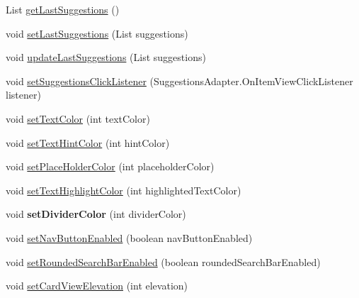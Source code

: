\begin{DoxyCompactItemize}
\item 
List \mbox{\hyperlink{classcom_1_1example_1_1searchwidget_1_1_search_bar_a29fff6f8fe5011b1854e4fd4a55ea65f}{get\+Last\+Suggestions}} ()
\item 
void \mbox{\hyperlink{classcom_1_1example_1_1searchwidget_1_1_search_bar_a36b0bcb2dd221d8cba1b64955a51b597}{set\+Last\+Suggestions}} (List suggestions)
\item 
void \mbox{\hyperlink{classcom_1_1example_1_1searchwidget_1_1_search_bar_af6c85628bb5df58074e37d47193bc3f0}{update\+Last\+Suggestions}} (List suggestions)
\item 
void \mbox{\hyperlink{classcom_1_1example_1_1searchwidget_1_1_search_bar_a2c7e29edef133c2885ed261f14dcd329}{set\+Suggestions\+Click\+Listener}} (Suggestions\+Adapter.\+On\+Item\+View\+Click\+Listener listener)
\item 
void \mbox{\hyperlink{classcom_1_1example_1_1searchwidget_1_1_search_bar_ac6711d0557a28b29ac41b0ed4e489e02}{set\+Text\+Color}} (int text\+Color)
\item 
void \mbox{\hyperlink{classcom_1_1example_1_1searchwidget_1_1_search_bar_a70b21b5c03c532cb74f64e16c992f95d}{set\+Text\+Hint\+Color}} (int hint\+Color)
\item 
void \mbox{\hyperlink{classcom_1_1example_1_1searchwidget_1_1_search_bar_aa27cf7d4a9e11d4b452a7be85c15e9e6}{set\+Place\+Holder\+Color}} (int placeholder\+Color)
\item 
void \mbox{\hyperlink{classcom_1_1example_1_1searchwidget_1_1_search_bar_a538551052205575951500130dc5ed591}{set\+Text\+Highlight\+Color}} (int highlighted\+Text\+Color)
\item 
\mbox{\label{classcom_1_1example_1_1searchwidget_1_1_search_bar_a7bc0782abebd55d66cf53dc26491aefb}} 
void {\bfseries set\+Divider\+Color} (int divider\+Color)
\item 
void \mbox{\hyperlink{classcom_1_1example_1_1searchwidget_1_1_search_bar_a4ad3a854a853a3f990f493b053ba8297}{set\+Nav\+Button\+Enabled}} (boolean nav\+Button\+Enabled)
\item 
void \mbox{\hyperlink{classcom_1_1example_1_1searchwidget_1_1_search_bar_af2188426a0fd543d09dfcc0042c9cee9}{set\+Rounded\+Search\+Bar\+Enabled}} (boolean rounded\+Search\+Bar\+Enabled)
\item 
void \mbox{\hyperlink{classcom_1_1example_1_1searchwidget_1_1_search_bar_af60f6509efc9ca6466b54e46bd3a5709}{set\+Card\+View\+Elevation}} (int elevation)

\end{DoxyCompactItemize}
